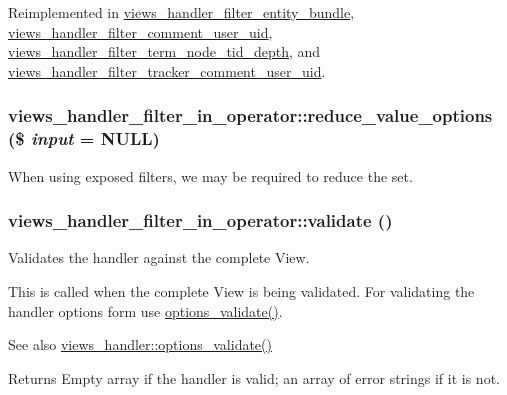 Reimplemented in \hyperlink{classviews__handler__filter__entity__bundle_a383511f8da47317cb77498e2705b9470}{views\_\-handler\_\-filter\_\-entity\_\-bundle}, \hyperlink{classviews__handler__filter__comment__user__uid_a5b649bd04038ac8ed577410ad54ad5b0}{views\_\-handler\_\-filter\_\-comment\_\-user\_\-uid}, \hyperlink{classviews__handler__filter__term__node__tid__depth_aff1d2c0057597790a56bffd0674f391a}{views\_\-handler\_\-filter\_\-term\_\-node\_\-tid\_\-depth}, and \hyperlink{classviews__handler__filter__tracker__comment__user__uid_a95b14e84882db3a1911c885c606e8835}{views\_\-handler\_\-filter\_\-tracker\_\-comment\_\-user\_\-uid}.\hypertarget{classviews__handler__filter__in__operator_a852f413796906e05a5dca6e839e8e470}{
\subsubsection[{reduce\_\-value\_\-options}]{\setlength{\rightskip}{0pt plus 5cm}views\_\-handler\_\-filter\_\-in\_\-operator::reduce\_\-value\_\-options (\$ {\em input} = {\ttfamily NULL})}}
\label{classviews__handler__filter__in__operator_a852f413796906e05a5dca6e839e8e470}
When using exposed filters, we may be required to reduce the set. \hypertarget{classviews__handler__filter__in__operator_a5d2cc4d0420cc3a8949e371c694230d3}{
\subsubsection[{validate}]{\setlength{\rightskip}{0pt plus 5cm}views\_\-handler\_\-filter\_\-in\_\-operator::validate ()}}
\label{classviews__handler__filter__in__operator_a5d2cc4d0420cc3a8949e371c694230d3}
Validates the handler against the complete View.

This is called when the complete View is being validated. For validating the handler options form use \hyperlink{classviews__handler__filter_a1156751e912662ce47ad680cbe2c03a3}{options\_\-validate()}.

\begin{DoxySeeAlso}{See also}
\hyperlink{classviews__handler_a831c00b8cd3c667e25db014a3413273c}{views\_\-handler::options\_\-validate()}
\end{DoxySeeAlso}
\begin{DoxyReturn}{Returns}
Empty array if the handler is valid; an array of error strings if it is not. 
\end{DoxyReturn}


